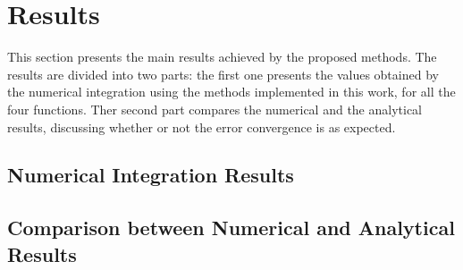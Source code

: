 \section{Results} \label{sec:results}
This section presents the main results achieved by the proposed methods. The results are divided into two parts: the first one presents the values obtained by the numerical integration using the methods implemented in this work, for all the four functions. Ther second part compares the numerical and the analytical results, discussing whether or not the error convergence is as expected. 

\subsection{Numerical Integration Results}

\subsection{Comparison between Numerical and Analytical Results}